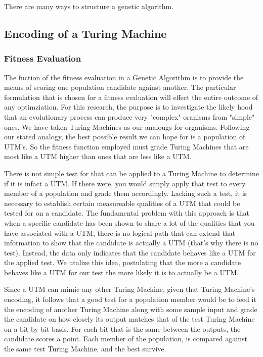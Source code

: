 There are many ways to structure a genetic algorithm. 

\subsection{Encoding of a Turing Machine}

\subsubsection{Fitness Evaluation}
The fuction of the fitness evaluation in a Genetic Algorithm is to provide the means of scoring one population candidate against another. The particular formulation that is chosen for a fitness evaluation will effect the entire outcome of any optimziation. For this research, the purpose is to investigate the likely hood that an evolutionary process can produce very "complex" oranisms from "simple" ones. We have taken Turing Machines as our analougs for organisms. Following our stated analogy, the best possible result we can hope for is a population of UTM's. So the fitness function employed must grade Turing Machines that are most like a UTM higher than ones that are less like a UTM.  

There is not simple test for that can be applied to a Turing Machine to determine if it is infact a UTM. If there were, you would simply apply that test to every member of a population and grade them accordingly. Lacking such a test, it is necessary to establish certain measureable qualities of a UTM that could be tested for on a candidate. The fundamental problem with this approach is that when a specific candidate has been shown to share a lot of the qualities that you have associated with a UTM, there is no logical path that can extend that information to show that the candidate is actually a UTM (that's why there is no test). Instead, the data only indicates that the candidate behaves like a UTM for the applied test. We utalize this idea, postulating that the more a candidate behaves like a UTM for our test the more likely it is to actually be a UTM. 

Since a UTM can mimic any other Turing Machine, given that Turing Machine's encoding, it follows that a good test for a population member would be to feed it the encoding of another Turing Machine along with some sample input and grade the candidate on how closely its output matches that of the test Turing Machine on a bit by bit basis. For each bit that is the same between the outputs, the candidate scores a point. Each member of the population, is compared against the same test Turing Machine, and the best survive. 

